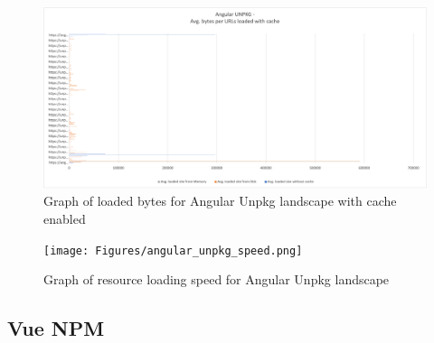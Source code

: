 \newpage
\begin{figure}[!h]
	\centering
	\includegraphics[width=1.4\textwidth, angle=90]{Figures/angular_unpkg_bytes_cache.png}
	\caption{Graph of loaded bytes for Angular Unpkg landscape with cache enabled}
	\label{fig:appendix_1_9}
\end{figure}
\newpage
\begin{figure}[!h]
	\centering
	\texttt{[image: Figures/angular\_unpkg\_speed.png]}
	\caption{Graph of resource loading speed for Angular Unpkg landscape}
	\label{fig:appendix_1_10}
\end{figure}
\newpage

\subsection{Vue NPM}

